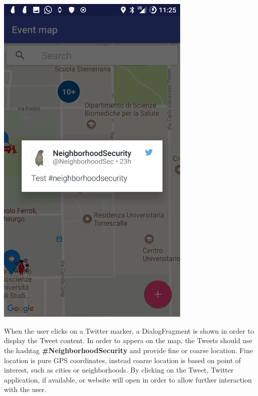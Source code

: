 \documentclass[a4paper]{scrreprt}
\begin{document}
\begin{minipage}{0.5\textwidth}
	\centering
	\includegraphics[width=0.7\textwidth]{imgs/twitter}
\end{minipage}
\begin{minipage}{0.5\textwidth}
	When the user clicks on a Twitter marker, a DialogFragment is shown in order to display the Tweet content. In order to appera on the map, the Tweets should use the hashtag \textbf{\#NeighborhoodSecurity} and provide fine or coarse location. Fine location is pure GPS coordinates, instead coarse location is based on point of interest, such as cities or neighborhoods. By clicking on the Tweet, Twitter application, if available, or website will open in order to allow further interaction with the user.
\end{minipage}
\end{document}
